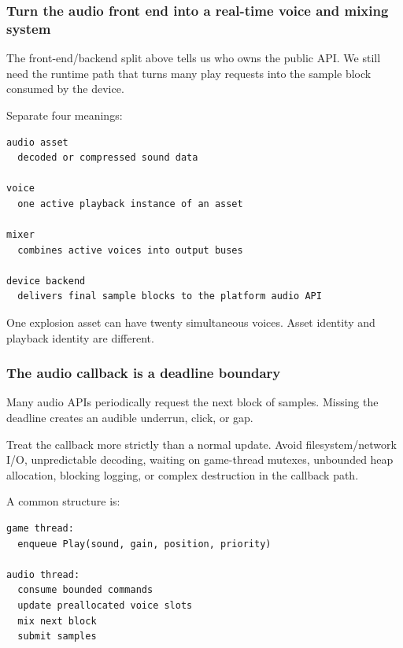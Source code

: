 \subsubsection{Turn the audio front end into a real-time voice and mixing system}\label{05-engine-i-ch009-turn-the-audio-front-end-into-a-real-time-voice-and-mixing-system}

\hypertarget{05-engine-i-ch009-turn-the-audio-front-end-into-a-real-time-voice-and-mixing-system}{}

The front-end/backend split above tells us who owns the public API. We still need the runtime path that turns many play requests into the sample block consumed by the device.

Separate four meanings:

\begin{verbatim}
audio asset
  decoded or compressed sound data

voice
  one active playback instance of an asset

mixer
  combines active voices into output buses

device backend
  delivers final sample blocks to the platform audio API
\end{verbatim}

One explosion asset can have twenty simultaneous voices. Asset identity and playback identity are different.

\subsubsection{The audio callback is a deadline boundary}\label{05-engine-i-ch009-the-audio-callback-is-a-deadline-boundary}

\hypertarget{05-engine-i-ch009-the-audio-callback-is-a-deadline-boundary}{}

Many audio APIs periodically request the next block of samples. Missing the deadline creates an audible underrun, click, or gap.

Treat the callback more strictly than a normal update. Avoid filesystem/network I/O, unpredictable decoding, waiting on game-thread mutexes, unbounded heap allocation, blocking logging, or complex destruction in the callback path.

A common structure is:

\begin{verbatim}
game thread:
  enqueue Play(sound, gain, position, priority)

audio thread:
  consume bounded commands
  update preallocated voice slots
  mix next block
  submit samples
\end{verbatim}

